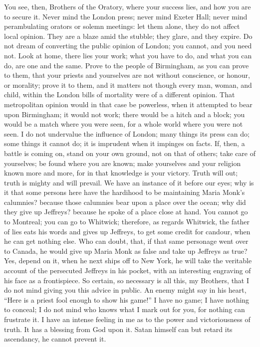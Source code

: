 You see, then, Brothers of the Oratory, where your
success lies, and how you are to secure it. Never mind
the London press; never mind Exeter Hall; never mind
perambulating orators or solemn meetings: let them alone,
they do not affect local opinion. They are a blaze amid
the stubble; they glare, and they expire. Do not dream of
converting the public opinion of London; you cannot, and
you need not. Look at home, there lies your work; what
you have to do, and what you can do, are one and the
same. Prove to the people of Birmingham, as you can prove
to them, that your priests and yourselves are not without
conscience, or honour, or morality; prove it to them, and
it matters not though every man, woman, and child, within
the London bills of mortality were of a different
opinion. That metropolitan opinion would in that case be
powerless, when it attempted to bear upon Birmingham; it
would not work; there would be a hitch and a block; you
would be a match where you were seen, for a whole world
where you were not seen. I do not undervalue the
influence of London; many things its press can do; some
things it cannot do; it is imprudent when it impinges on
facts. If, then, a battle is coming on, stand on your own
ground, not on that of others; take care of yourselves;
be found where you are known; make yourselves and your
religion known more and more, for in that knowledge is
your victory. Truth will out; truth is mighty and will
prevail. We have an instance of it before our eyes; why
is it that some persons here have the hardihood to be
maintaining Maria Monk's calumnies? because those
calumnies bear upon a place over the ocean; why did they
give up Jeffreys? because he spoke of a place close at
hand. You cannot go to Montreal; you can go to Whitwick;
therefore, as regards Whitwick, the father of lies eats
his words and gives up Jeffreys, to get some credit for
candour, when he can get nothing else. Who can doubt,
that, if that same personage went over to Canada, he
would give up Maria Monk as false and take up Jeffreys as
true? Yes, depend on it, when he next ships off to New
York, he will take the veritable account of the
persecuted Jeffreys in his pocket, with an interesting
engraving of his face as a frontispiece. So certain, so
necessary is all this, my Brothers, that I do not mind
giving you this advice in public. An enemy might say in
his heart, ``Here is a priest fool enough to show his
game!'' I have no game; I have nothing to conceal; I
do not mind who knows what I mark out for you, for
nothing can frustrate it. I have an intense feeling in me
as to the power and victoriousness of truth. It has a
blessing from God upon it. Satan himself can but retard
its ascendancy, he cannot prevent it.

